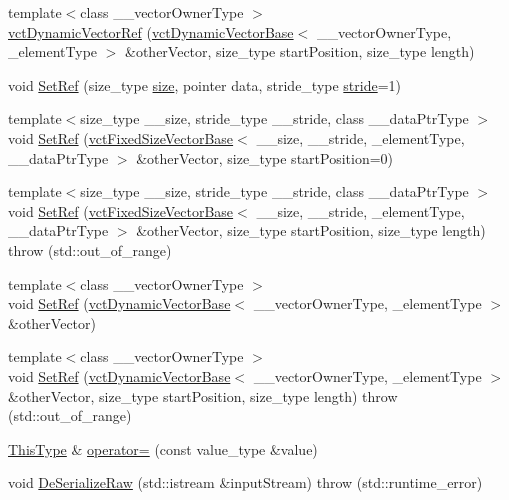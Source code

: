 \begin{DoxyCompactItemize}
\item 
{\footnotesize template$<$class \-\_\-\-\_\-vector\-Owner\-Type $>$ }\\\hyperlink{classvct_dynamic_vector_ref_aa36b799a85eec00fb811c78de50e74b8}{vct\-Dynamic\-Vector\-Ref} (\hyperlink{classvct_dynamic_vector_base}{vct\-Dynamic\-Vector\-Base}$<$ \-\_\-\-\_\-vector\-Owner\-Type, \-\_\-element\-Type $>$ \&other\-Vector, size\-\_\-type start\-Position, size\-\_\-type length)
\item 
void \hyperlink{classvct_dynamic_vector_ref_aafa4ebcfe74bf97ca55f902f8864722f}{Set\-Ref} (size\-\_\-type \hyperlink{classvct_dynamic_const_vector_base_a79950d8cced7fd4e790d9ac2ca1c43a7}{size}, pointer data, stride\-\_\-type \hyperlink{classvct_dynamic_const_vector_base_af0440ce847480b353e9f85edccc03158}{stride}=1)
\item 
{\footnotesize template$<$size\-\_\-type \-\_\-\-\_\-size, stride\-\_\-type \-\_\-\-\_\-stride, class \-\_\-\-\_\-data\-Ptr\-Type $>$ }\\void \hyperlink{classvct_dynamic_vector_ref_af452defc85575d5c5d2db08bd3b24efb}{Set\-Ref} (\hyperlink{classvct_fixed_size_vector_base}{vct\-Fixed\-Size\-Vector\-Base}$<$ \-\_\-\-\_\-size, \-\_\-\-\_\-stride, \-\_\-element\-Type, \-\_\-\-\_\-data\-Ptr\-Type $>$ \&other\-Vector, size\-\_\-type start\-Position=0)
\item 
{\footnotesize template$<$size\-\_\-type \-\_\-\-\_\-size, stride\-\_\-type \-\_\-\-\_\-stride, class \-\_\-\-\_\-data\-Ptr\-Type $>$ }\\void \hyperlink{classvct_dynamic_vector_ref_a5233ced95b3c4eb5e4c0e433da0d52b0}{Set\-Ref} (\hyperlink{classvct_fixed_size_vector_base}{vct\-Fixed\-Size\-Vector\-Base}$<$ \-\_\-\-\_\-size, \-\_\-\-\_\-stride, \-\_\-element\-Type, \-\_\-\-\_\-data\-Ptr\-Type $>$ \&other\-Vector, size\-\_\-type start\-Position, size\-\_\-type length)  throw (std\-::out\-\_\-of\-\_\-range)
\item 
{\footnotesize template$<$class \-\_\-\-\_\-vector\-Owner\-Type $>$ }\\void \hyperlink{classvct_dynamic_vector_ref_afb5c094aeb369314d69925a5307c5e1c}{Set\-Ref} (\hyperlink{classvct_dynamic_vector_base}{vct\-Dynamic\-Vector\-Base}$<$ \-\_\-\-\_\-vector\-Owner\-Type, \-\_\-element\-Type $>$ \&other\-Vector)
\item 
{\footnotesize template$<$class \-\_\-\-\_\-vector\-Owner\-Type $>$ }\\void \hyperlink{classvct_dynamic_vector_ref_abf288f528fde8390d6da37f4cd70c1ac}{Set\-Ref} (\hyperlink{classvct_dynamic_vector_base}{vct\-Dynamic\-Vector\-Base}$<$ \-\_\-\-\_\-vector\-Owner\-Type, \-\_\-element\-Type $>$ \&other\-Vector, size\-\_\-type start\-Position, size\-\_\-type length)  throw (std\-::out\-\_\-of\-\_\-range)
\item 
\hyperlink{classvct_dynamic_vector_ref_adde8a247e72c476120c26cfa15a37c6d}{This\-Type} \& \hyperlink{classvct_dynamic_vector_ref_a9c5f2236e7f922e4641f8c67d12f5fa5}{operator=} (const value\-\_\-type \&value)
\item 
void \hyperlink{classvct_dynamic_vector_ref_aba3385123199939ab0678859b2f7f072}{De\-Serialize\-Raw} (std\-::istream \&input\-Stream)  throw (std\-::runtime\-\_\-error)
\end{DoxyCompactItemize}
